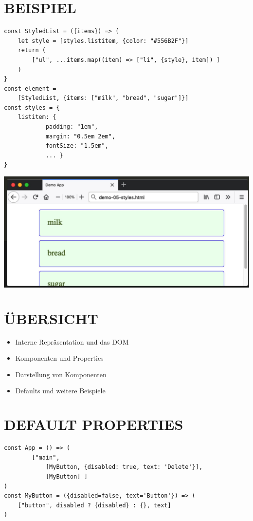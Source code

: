 \documentclass[10pt]{article}
\begin{document}
\section*{BEISPIEL}
\begin{verbatim}
const StyledList = ({items}) => {
    let style = [styles.listitem, {color: "#556B2F"}]
    return (
        ["ul", ...items.map((item) => ["li", {style}, item]) ]
    )
}
const element =
    [StyledList, {items: ["milk", "bread", "sugar"]}]
const styles = {
    listitem: {
            padding: "1em",
            margin: "0.5em 2em",
            fontSize: "1.5em",
            ... }
}
\end{verbatim}

\begin{center}
\includegraphics[width=\linewidth]{images/2025_01_02_254b5e4c52d090c313e1g-35}
\end{center}

\section*{ÜBERSICHT}
\begin{itemize}
  \item Interne Repräsentation und das DOM
  \item Komponenten und Properties
  \item Darstellung von Komponenten
  \item Defaults und weitere Beispiele
\end{itemize}

\section*{DEFAULT PROPERTIES}
\begin{verbatim}
const App = () => (
        ["main",
            [MyButton, {disabled: true, text: 'Delete'}],
            [MyButton] ]
)
const MyButton = ({disabled=false, text='Button'}) => (
    ["button", disabled ? {disabled} : {}, text]
)
\end{verbatim}
\end{document}
